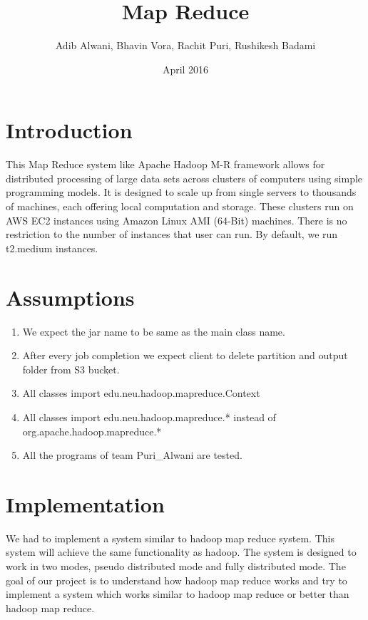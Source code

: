 \documentclass{article}
\title{\Huge \textbf{Map Reduce}}
\author{\large{Adib Alwani, Bhavin Vora, Rachit Puri, Rushikesh Badami}}
\date{April 2016}
\begin{document}
\maketitle

\section{Introduction}

This Map Reduce system like Apache Hadoop M-R framework allows for distributed processing of large data sets across clusters of computers using simple programming models. It is designed to scale up from single servers to thousands of machines, each offering local computation and storage. These clusters run on AWS EC2 instances using Amazon Linux AMI (64-Bit) machines. There is no restriction to the number of instances that user can run. By default, we run t2.medium instances. 

\section{Assumptions}

\begin{enumerate}
    \item We expect the jar name to be same as the main class name.
    
    \item After every job completion we expect client to delete partition and output folder from S3 bucket.
    
    \item All classes import edu.neu.hadoop.mapreduce.Context
    
    \item All classes import edu.neu.hadoop.mapreduce.* instead of org.apache.hadoop.mapreduce.*
    
    \item All the programs of team Puri\_Alwani are tested. 
    
\end{enumerate}


\section{Implementation}

We had to implement a system similar to hadoop map reduce system. This system will achieve the same functionality as hadoop. The system is designed to work in two modes, pseudo distributed mode and 
fully distributed mode. The goal of our project is to understand how hadoop map reduce works and try to implement a system which works similar to hadoop map reduce or better than hadoop map reduce.
\end{document}
